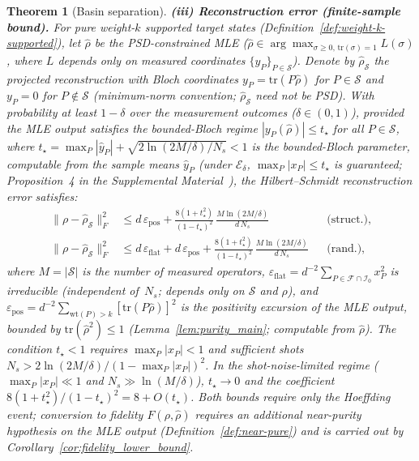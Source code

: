 \documentclass[twocolumn,prx,aps,superscriptaddress,longbibliography,floatfix]{revtex4-2}
\newtheorem{theorem}{Theorem}
\begin{document}
\begin{theorem}[Basin separation]
\medskip\noindent
\textbf{(iii) Reconstruction error (finite-sample bound).}
For pure weight-$k$ supported target states
(Definition~\ref{def:weight-k-supported}),
let $\hat\rho$ be the PSD-constrained MLE
($\hat\rho \in \arg\max_{\sigma \ge 0,\,\mathrm{tr}(\sigma)=1}
L(\sigma)$, where $L$ depends only on measured
coordinates $\{y_P\}_{P \in \mathcal{S}}$).
Denote by $\hat\rho_{\mathcal{S}}$ the projected
reconstruction with Bloch coordinates
$y_P = \mathrm{tr}(P\hat\rho)$ for
$P \in \mathcal{S}$ and $y_P = 0$ for
$P \notin \mathcal{S}$ (minimum-norm convention;
$\hat\rho_{\mathcal{S}}$ need not be PSD).
With probability at least $1 - \delta$ over the measurement
outcomes ($\delta \in (0,1)$), provided the MLE output
satisfies the bounded-Bloch regime
$|y_P(\hat\rho)| \le t_\star$ for all $P \in \mathcal{S}$,
where
$t_\star = \max_P |\hat{y}_P| + \sqrt{2\ln(2M/\delta)/N_s} < 1$
is the bounded-Bloch parameter, computable from the sample means
$\hat{y}_P$ (under $\mathcal{E}_\delta$,
$\max_P |x_P| \le t_\star$ is guaranteed;
Proposition~4 in the Supplemental Material~\cite{supplemental}),
the Hilbert--Schmidt
reconstruction error satisfies:
\begin{align}
  \|\rho - \hat\rho_{\mathcal{S}}\|_F^2 &\le
  d\,\varepsilon_{\mathrm{pos}}
  + \frac{8(1{+}t_\star^2)}{(1{-}t_\star)^2}
    \,\frac{M\ln(2M/\delta)}{d\,N_s}
  & &\text{(struct.)}, \label{eq:fid-structured} \\
  \|\rho - \hat\rho_{\mathcal{S}}\|_F^2 &\le
  d\,\varepsilon_{\mathrm{flat}}
  + d\,\varepsilon_{\mathrm{pos}}
  + \frac{8(1{+}t_\star^2)}{(1{-}t_\star)^2}
    \,\frac{M\ln(2M/\delta)}{d\,N_s}
  & &\text{(rand.)}, \label{eq:fid-random}
\end{align}
where $M = |\mathcal{S}|$ is the number of measured operators,
$\varepsilon_{\mathrm{flat}} = d^{-2}\sum_{P \in
\mathcal{F} \cap \mathcal{I}_0} x_P^2$ is irreducible
(independent of~$N_s$; depends only on $\mathcal{S}$ and $\rho$), and
$\varepsilon_{\mathrm{pos}} = d^{-2}\sum_{\mathrm{wt}(P)>k}
[\mathrm{tr}(P\hat\rho)]^2$
is the positivity excursion of the MLE output,
bounded by $\mathrm{tr}(\hat\rho^2) \le 1$
(Lemma~\ref{lem:purity_main}; computable from $\hat\rho$).
The condition $t_\star < 1$ requires
$\max_P |x_P| < 1$ and sufficient shots
$N_s > 2\ln(2M/\delta)/(1{-}\max_P|x_P|)^2$.
In the shot-noise-limited regime ($\max_P |x_P| \ll 1$ and $N_s \gg \ln(M/\delta)$),
$t_\star \to 0$ and the coefficient
$8(1{+}t_\star^2)/(1{-}t_\star)^2 = 8 + O(t_\star)$.
Both bounds require only the
Hoeffding event; conversion to fidelity $F(\rho,\hat\rho)$
requires an additional near-purity hypothesis on the MLE
output (Definition~\ref{def:near-pure}) and is carried out by
Corollary~\ref{cor:fidelity_lower_bound}.
\end{theorem}
\end{document}
